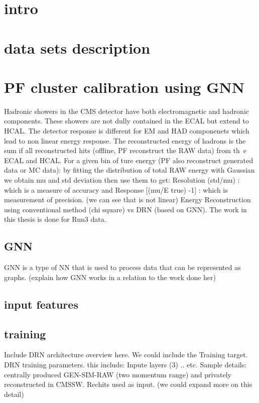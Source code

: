 
\section{intro}


\section{data sets description}

\section{PF cluster calibration using GNN}
Hadronic showers in the CMS detector have both electromagnetic and hadronic components.
These showers are not dully contained in the ECAL but extend to HCAL.
The detector response is different for EM and HAD componenets which lead to non linear energy response.
The reconstructed energy of hadrons is the sum if all reconstructed hits (offline, PF reconstruct the RAW data) from th\
e ECAL and HCAL.
For a given bin of ture energy (PF also reconstruct generated data or MC data):
by fitting the distribution of total RAW energy with Gaussian we obtain mu and std deviation then use them to get:
Resolution (std/mu) : which is a measure of accuracy
and Response [(mu/E true) -1] : which is measurement of precision. (we can see that is not linear)
Energy Reconstruction using conventional method (chi square) vs DRN (based on GNN).
The work in this thesis is done for Run3 data.

\subsection{GNN}
GNN is a type of NN that is used to process data that can be represented as graphs.
(explain how GNN works in a relation to the work done her) 
\subsection{input features}

\subsection{training}
Include DRN architecture overview here. We could include the Training target.
DRN training parameters. this include: Inpute layers (3) .. etc.
Sample details: centrally produced GEN-SIM-RAW (two momentum range) and privately reconstructed in CMSSW.
Rechits used as input. (we could expand more on this detail)

